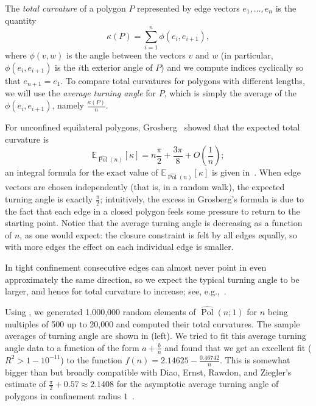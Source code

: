 \documentclass{article}
\theoremstyle{definition}
\newcommand{\Polhat}{\widehat{\operatorname{Pol}}}
\begin{document}
	The \emph{total curvature} of a polygon $P$ represented by edge vectors $e_1, \dots , e_n$ is the quantity
	\[
		\kappa(P) = \sum_{i=1}^n \phi(e_i, e_{i+1}),
	\]
	where $\phi(v,w)$ is the angle between the vectors $v$ and $w$ (in particular, $\phi(e_i,e_{i+1})$ is the $i$th exterior angle of $P$) and we compute indices cyclically so that $e_{n+1} = e_1$. To compare total curvatures for polygons with different lengths, we will use the \emph{average turning angle} for $P$, which is simply the average of the $\phi(e_i,e_{i+1})$, namely $\frac{\kappa(P)}{n}$.

	For unconfined equilateral polygons, Grosberg~\cite{grosbergTotalCurvatureTotal2008} showed that the expected total curvature is
	\[
		\mathbb{E}_{\Polhat(n)}[\kappa] = n \frac{\pi}{2} + \frac{3\pi}{8} + O\left(\frac{1}{n}\right);
	\]
	an integral formula for the exact value of $\mathbb{E}_{\Polhat(n)}[\kappa]$ is given in~\cite[Theorem~12]{cantarellaSymplecticGeometryClosed2016}. When edge vectors are chosen independently (that is, in a random walk), the expected turning angle is exactly $\frac{\pi}{2}$; intuitively, the excess in Grosberg's formula is due to the fact that each edge in a closed polygon feels some pressure to return to the starting point. Notice that the average turning angle is decreasing as a function of $n$, as one would expect: the closure constraint is felt by all edges equally, so with more edges the effect on each individual edge is smaller.

	In tight confinement consecutive edges can almost never point in even approximately the same direction, so we expect the typical turning angle to be larger, and hence for total curvature to increase; see, e.g.,~\cite{cantarellaSymplecticGeometryClosed2016,diaoTotalCurvatureTotal2018,diaoCurvatureRandomWalks2013}.

	Using , we generated 1,000,000 random elements of $\Polhat(n;1)$ for $n$ being multiples of 500 up to 20,000 and computed their total curvatures. The sample averages of turning angle are shown in  (left). We tried to fit this average turning angle data to a function of the form $a + \frac{b}{n}$ and found that we get an excellent fit ($R^2 > 1-10^{-11}$) to the function $f(n) = 2.14625-\frac{0.46742}{n}$. This is somewhat bigger than but broadly compatible with Diao, Ernst, Rawdon, and Ziegler's estimate of $\frac{\pi}{2} + 0.57 \approx 2.1408$ for the asymptotic average turning angle of polygons in confinement radius $1$~\cite[Figure~2(a)]{diaoTotalCurvatureTotal2018}.
\end{document}
